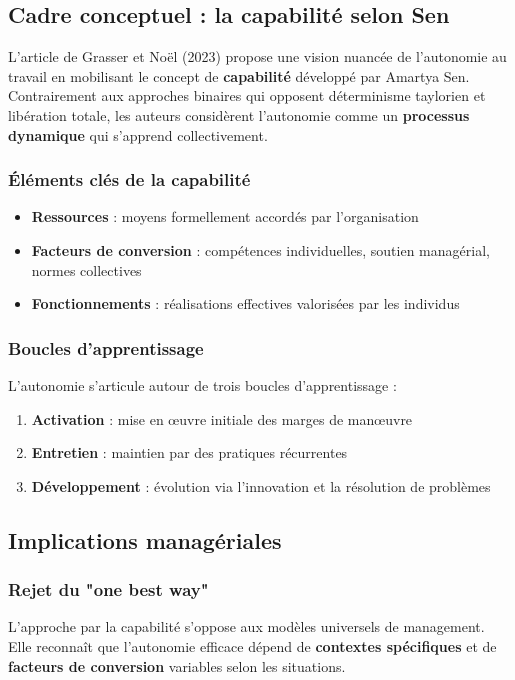 \documentclass[12pt,a4paper]{article}
\begin{document}
\subsection{Cadre conceptuel : la capabilité selon Sen}

L'article de Grasser et Noël (2023) propose une vision nuancée de l'autonomie au travail en mobilisant le concept de \textbf{capabilité} développé par Amartya Sen. Contrairement aux approches binaires qui opposent déterminisme taylorien et libération totale, les auteurs considèrent l'autonomie comme un \textbf{processus dynamique} qui s'apprend collectivement.

\subsubsection{Éléments clés de la capabilité}
\begin{itemize}
    \item \textbf{Ressources} : moyens formellement accordés par l'organisation
    \item \textbf{Facteurs de conversion} : compétences individuelles, soutien managérial, normes collectives
    \item \textbf{Fonctionnements} : réalisations effectives valorisées par les individus
\end{itemize}

\subsubsection{Boucles d'apprentissage}
L'autonomie s'articule autour de trois boucles d'apprentissage :
\begin{enumerate}
    \item \textbf{Activation} : mise en œuvre initiale des marges de manœuvre
    \item \textbf{Entretien} : maintien par des pratiques récurrentes
    \item \textbf{Développement} : évolution via l'innovation et la résolution de problèmes
\end{enumerate}

\subsection{Implications managériales}

\subsubsection{Rejet du "one best way"}
L'approche par la capabilité s'oppose aux modèles universels de management. Elle reconnaît que l'autonomie efficace dépend de \textbf{contextes spécifiques} et de \textbf{facteurs de conversion} variables selon les situations.
\end{document}
